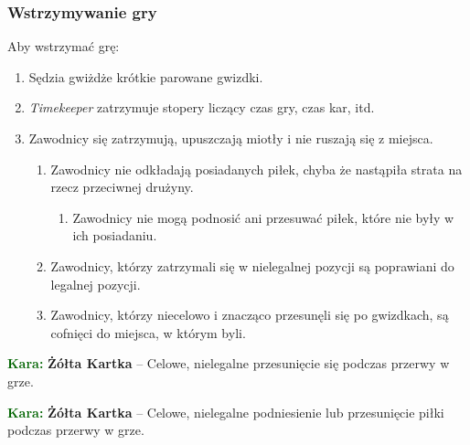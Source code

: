 \documentclass[11pt,a4paper]{article}
\newcommand\yellowcard[1]{\bgroup\textcolor{darkgreen}{\textbf{Kara: }}\bgroup\textcolor{darkyellow}{\textbf{Żółta Kartka}} -- #1}
\begin{document}
\subsubsection{Wstrzymywanie gry}
Aby wstrzymać grę:
\begin{enumerate}
  \item Sędzia gwiżdże krótkie parowane gwizdki.
  \item \emph{Timekeeper} zatrzymuje stopery liczący czas gry, czas kar, itd.
  \item Zawodnicy się zatrzymują, upuszczają miotły i nie ruszają się z miejsca.
  \begin{enumerate}
    \item Zawodnicy nie odkładają posiadanych piłek, chyba że nastąpiła strata na rzecz przeciwnej drużyny.
    \begin{enumerate}
      \item Zawodnicy nie mogą podnosić ani przesuwać piłek, które nie były w ich posiadaniu.
    \end{enumerate}
    \item Zawodnicy, którzy zatrzymali się w nielegalnej pozycji są poprawiani do legalnej pozycji.
    \item Zawodnicy, którzy niecelowo i znacząco przesunęli się po gwizdkach, są cofnięci do miejsca, w którym byli.
  \end{enumerate}
\end{enumerate}

\yellowcard{Celowe, nielegalne przesunięcie się podczas przerwy w grze.}

\yellowcard{Celowe, nielegalne podniesienie lub przesunięcie piłki podczas przerwy w grze.}
\end{document}
